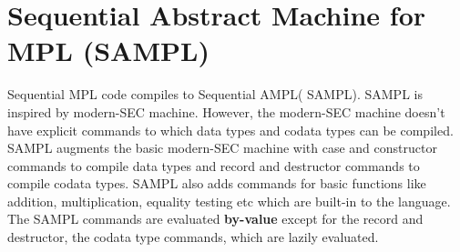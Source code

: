 \documentclass[11pt]{article}
\newcommand{\<}{\langle}
\renewcommand{\>}{\rangle}
\begin{document}
\section {Sequential Abstract Machine for MPL (SAMPL)}
Sequential MPL code compiles to Sequential AMPL( SAMPL). SAMPL is inspired by modern-SEC machine. However, the modern-SEC machine doesn't have explicit commands to which data types and codata types can be compiled. SAMPL augments the basic modern-SEC machine with {\sf case} and {\sf constructor} commands to compile data types and  {\sf record} and {\sf destructor} commands to compile codata types. SAMPL also adds commands for basic functions like addition, multiplication, equality testing etc which are built-in to the language. The SAMPL commands are evaluated {\bf by-value} except for the {\sf record} and {\sf destructor}, the codata type commands, which are lazily evaluated.
\end{document}
